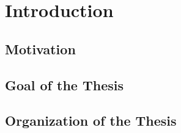 \chapter{Introduction}
\section{Motivation}
\section{Goal of the Thesis}
\section{Organization of the Thesis}
